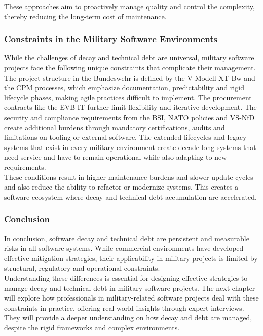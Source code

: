 These approaches aim to proactively manage quality and control the complexity, thereby reducing the long-term cost of maintenance. 

\subsubsection{Constraints in the Military Software Environments}
While the challenges of decay and technical debt are universal, military software projects face the following unique constraints that complicate their management.\\

The project structure in the Bundeswehr is defined by the V-Modell XT Bw and the \ac{CPM} processes, which emphasize documentation, predictability and rigid lifecycle phases, making agile practices difficult to implement.
The procurement contracts like the \ac{EVB-IT} further limit flexibility and iterative development. The security and compliance requirements from the BSI, NATO policies and VS-NfD create additional burdens through mandatory certifications, audits and limitations on tooling or external software.
The extended lifecycles and legacy systems that exist in every military environment create decade long systems that need service and have to remain operational while also adapting to new requirements.\\

These conditions result in higher maintenance burdens and slower update cycles and also reduce the ability to refactor or modernize systems. This creates a software ecosystem where decay and technical debt accumulation are accelerated.\\

\subsubsection{Conclusion}
In conclusion, software decay and technical debt are persistent and measurable risks in all software systems. While commercial environments have developed effective mitigation strategies, their applicability in military projects is limited by structural, regulatory and operational constraints.\\

Understanding these differences is essential for designing effective strategies to manage decay and technical debt in military software projects. The next chapter will explore how professionals in military-related software projects deal with these constraints in practice, offering real-world
insights through expert interviews. They will provide a deeper understanding on how decay and debt are managed, despite the rigid frameworks and complex environments.

